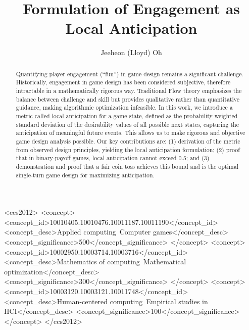 \documentclass[manuscript,review,anonymous]{acmart}
\theoremstyle{definition}
\theoremstyle{plain}
\begin{document}
\title[Theory of Anticipation]{Formulation of Engagement as Local Anticipation}

\author{Jeeheon (Lloyd) Oh}

\begin{abstract}
  Quantifying player engagement (``fun'') in game design remains a significant challenge.
  Historically, engagement in game design has been considered subjective, therefore intractable in a mathematically rigorous way.
  Traditional Flow theory emphasizes the balance between challenge and skill but provides qualitative rather than quantitative guidance, making algorithmic optimization infeasible.
  In this work, we introduce a metric called local anticipation for a game state, defined as the probability-weighted standard deviation of the desirability values of all possible next states, capturing the anticipation of meaningful future events.
  This allows us to make rigorous and objective game design analysis possible.
  Our key contributions are:
  (1) derivation of the metric from observed design principles, yielding the local anticipation formulation;
  (2) proof that in binary-payoff games, local anticipation cannot exceed 0.5; and
  (3) demonstration and proof that a fair coin toss achieves this bound and is the optimal single-turn game design for maximizing anticipation.
\end{abstract}

\begin{CCSXML}
  <ccs2012>
    <concept>
      <concept_id>10010405.10010476.10011187.10011190</concept_id>
      <concept_desc>Applied computing~Computer games</concept_desc>
      <concept_significance>500</concept_significance>
    </concept>
    <concept>
      <concept_id>10002950.10003714.10003716</concept_id>
      <concept_desc>Mathematics of computing~Mathematical optimization</concept_desc>
      <concept_significance>300</concept_significance>
    </concept>
    <concept>
      <concept_id>10003120.10003121.10011748</concept_id>
      <concept_desc>Human-centered computing~Empirical studies in HCI</concept_desc>
      <concept_significance>100</concept_significance>
    </concept>
  </ccs2012>
\end{CCSXML}

\end{document}
